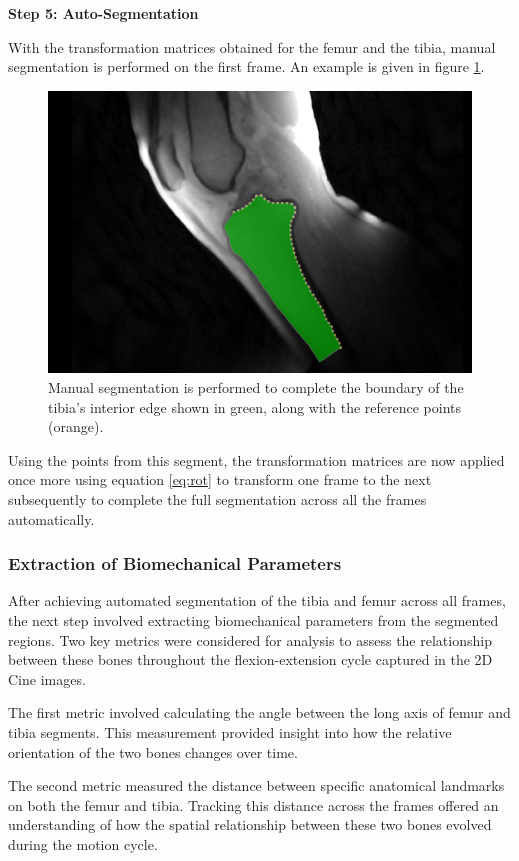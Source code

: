 \documentclass{micro-econ-thesis}
\begin{document}
\textbf{Step 5: Auto-Segmentation }

With the transformation matrices obtained for the femur and the tibia, manual segmentation is performed on the first frame. An example is given in figure \ref{fig:manualsegment}. 
\begin{figure} [H]
	\centering
	\includegraphics[width=0.7\linewidth]{manual_segment}
	\caption{Manual segmentation is performed to complete the boundary of the tibia's interior edge shown in green, along with the reference points (orange).}
	\label{fig:manualsegment}
\end{figure}

Using the points from this segment, the transformation matrices are now applied once more using equation \ref{eq:rot} to transform one frame to the next subsequently to complete the full segmentation across all the frames automatically. 

\subsubsection{Extraction of Biomechanical Parameters}
After achieving automated segmentation of the tibia and femur across all frames, the next step involved extracting biomechanical parameters from the segmented regions. Two key metrics were considered for analysis to assess the relationship between these bones throughout the flexion-extension cycle captured in the 2D Cine images.

The first metric involved calculating the angle between the long axis of femur and tibia segments. This measurement provided insight into how the relative orientation of the two bones changes over time.

The second metric measured the distance between specific anatomical landmarks on both the femur and tibia. Tracking this distance across the frames offered an understanding of how the spatial relationship between these two bones evolved during the motion cycle. 
\end{document}
